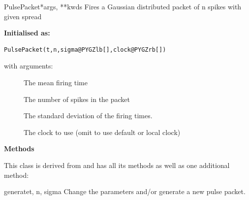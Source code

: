 \documentclass[letterpaper,10pt,english]{manual}
\begin{document}
\hypertarget{brian.PulsePacket}{}\begin{classdesc}{PulsePacket}{*args, **kwds}
Fires a Gaussian distributed packet of n spikes with given spread

\textbf{Initialised as:}

\begin{Verbatim}[commandchars=@\[\]]
PulsePacket(t,n,sigma@PYGZlb[],clock@PYGZrb[])
\end{Verbatim}

with arguments:
\begin{description}
\item[] \leavevmode
The mean firing time

\item[] \leavevmode
The number of spikes in the packet

\item[] \leavevmode
The standard deviation of the firing times.

\item[] \leavevmode
The clock to use (omit to use default or local clock)

\end{description}

\textbf{Methods}

This class is derived from \hyperlink{brian.SpikeGeneratorGroup}{} and has all its
methods as well as one additional method:

\hypertarget{brian.PulsePacket.generate}{}\begin{methoddesc}{generate}{t, n, sigma}
Change the parameters and/or generate a new pulse packet.
\end{methoddesc}
\end{classdesc}
\end{document}
